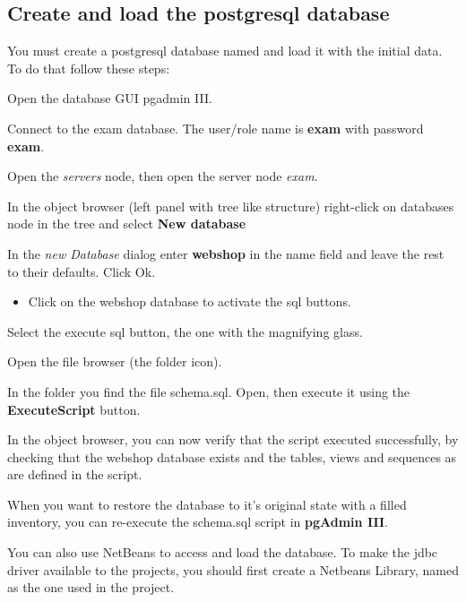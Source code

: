 \subsection{Create and load the postgresql database}

You must create a postgresql database named  and load it
with the initial data. To do that follow these steps:
\begin{enumerate*}\itemsep1pt\parskip0pt
\item Open the database GUI pgadmin III.
\item Connect to the exam database. The user/role name is
  \textbf{exam} with password \textbf{exam}.
\item Open the \textit{servers} node, then open the server node \textit{exam}.
\item In the object browser (left panel with tree like structure)
  right-click on databases node in the tree and select \textbf{New database}
\item In the \textit{new Database} dialog enter \textbf{webshop} in
  the name field and leave the rest to their defaults. Click Ok.
  \begin{itemize}
  \item Click on the webshop database to activate the sql buttons.
  \end{itemize}
\item Select the execute sql button, the one with the magnifying
  glass.
\item Open the file browser (the folder icon).
\item In the folder  you find the file
  {schema.sql}. Open, then execute it using the \textbf{ExecuteScript} button.
\item In the object browser, you can now verify that the script
  executed  successfully, by checking that the webshop database exists
  and the tables, views and sequences as are defined in the
  script. 
\end{enumerate*}

When you want to restore the database to it's original state with a
filled inventory, you can re-execute the schema.sql script in
\textbf{pgAdmin III}.

You can also use NetBeans to access and load the database.
To make the jdbc driver available to the projects, you should
first create a Netbeans Library, named as the one used in the project.

